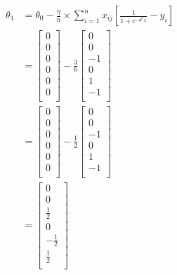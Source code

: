 \documentclass[
	number={4},
	title={Logistic Regression}
]{cs584notes}
\begin{document}
\begin{equation*}
\begin{aligned}
	\theta_{1} &= \theta_{0} - \frac{\eta}{n} \times \sum_{i=1}^{n} x_{ij} \left[ \frac{1}{1 + e^{-\theta^{T}x}} - y_{i} \right]\\
				&= \left[ \begin{array}{c}
					0\\
					0\\
					0\\
					0\\
					0\\
					0\\
			    \end{array} \right] - \frac{3}{6}\left[ \begin{array}{c}
					0\\
					0\\
					-1\\
					0\\
					1\\
					-1\\
			    \end{array} \right]\\
				&= \left[ \begin{array}{c}
					0\\
					0\\
					0\\
					0\\
					0\\
					0\\
			   \end{array} \right] - \frac{1}{2}\left[ \begin{array}{c}
					0\\
					0\\
					-1\\
					0\\
					1\\
					-1\\
			   \end{array} \right]\\
				&= \left[ \begin{array}{c}
					0\\
					0\\
					\frac{1}{2}\\
					0\\
					-\frac{1}{2}\\
					\frac{1}{2}\\
			   \end{array} \right]\\
\end{aligned}
\end{equation*}
\end{document}
